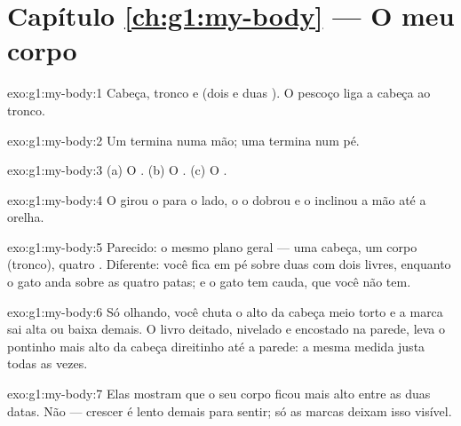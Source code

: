 \section*{Capítulo \ref{ch:g1:my-body} --- O meu corpo}

\begin{solution}{exo:g1:my-body:1}
Cabeça, tronco e  (dois  e duas ). O pescoço liga
a cabeça ao tronco.
\end{solution}

\begin{solution}{exo:g1:my-body:2}
Um  termina numa mão; uma  termina num pé.
\end{solution}

\begin{solution}{exo:g1:my-body:3}
(a) O . (b) O . (c) O .
\end{solution}

\begin{solution}{exo:g1:my-body:4}
O  girou o  para o lado, o  o dobrou e o 
inclinou a mão até a orelha.
\end{solution}

\begin{solution}{exo:g1:my-body:5}
Parecido: o mesmo plano geral --- uma cabeça, um corpo (tronco),
quatro . Diferente: você fica em pé sobre duas  com dois
 livres, enquanto o gato anda sobre as quatro patas; e o gato
tem cauda, que você não tem.
\end{solution}

\begin{solution}{exo:g1:my-body:6}
Só olhando, você chuta o alto da cabeça meio torto e a marca sai
alta ou baixa demais. O livro deitado, nivelado e encostado na
parede, leva o pontinho mais alto da cabeça direitinho até a parede:
a mesma medida justa todas as vezes.
\end{solution}

\begin{solution}{exo:g1:my-body:7}
Elas mostram que o seu corpo ficou mais alto entre as duas datas.
Não --- crescer é lento demais para sentir; só as marcas deixam isso
visível.
\end{solution}

